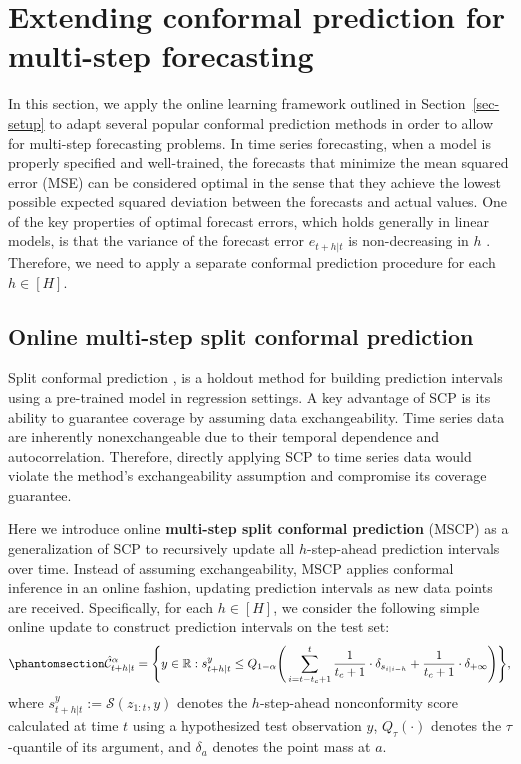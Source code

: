 \documentclass[
  11pt,
  12pt]{article}
\theoremstyle{plain}
\theoremstyle{remark}
\begin{document}
\section{Extending conformal prediction for multi-step
forecasting}\label{sec-ext}

In this section, we apply the online learning framework outlined in
Section~\ref{sec-setup} to adapt several popular conformal prediction
methods in order to allow for multi-step forecasting problems. In time
series forecasting, when a model is properly specified and well-trained,
the forecasts that minimize the mean squared error (MSE) can be
considered optimal in the sense that they achieve the lowest possible
expected squared deviation between the forecasts and actual values. One
of the key properties of optimal forecast errors, which holds generally
in linear models, is that the variance of the forecast error
\(e_{t+h|t}\) is non-decreasing in \(h\)
\citep{tong1990, diebold1996, patton2007}. Therefore, we need to apply a
separate conformal prediction procedure for each \(h \in [H]\).

\subsection{Online multi-step split conformal
prediction}\label{online-multi-step-split-conformal-prediction}

Split conformal prediction \citep[SCP, also called inductive conformal
prediction,][]{papadopoulos2002, vovk2005, lei2018}, is a holdout method
for building prediction intervals using a pre-trained model in
regression settings. A key advantage of SCP is its ability to guarantee
coverage by assuming data exchangeability. Time series data are
inherently nonexchangeable due to their temporal dependence and
autocorrelation. Therefore, directly applying SCP to time series data
would violate the method's exchangeability assumption and compromise its
coverage guarantee.

Here we introduce online \textbf{multi-step split conformal prediction}
(MSCP) as a generalization of SCP to recursively update all
\(h\)-step-ahead prediction intervals over time. Instead of assuming
exchangeability, MSCP applies conformal inference in an online fashion,
updating prediction intervals as new data points are received.
Specifically, for each \(h \in [H]\), we consider the following simple
online update to construct prediction intervals on the test set:
\begin{equation}\phantomsection\label{eq-mscp}{
\hat{\mathcal{C}}_{t+h|t}^{\alpha} = \Bigg\{y\in\mathbb{R}: s_{t+h|t}^{y} \leq Q_{1-\alpha}\Bigg(\sum_{i=t-t_c+1}^{t}\frac{1}{t_c+1}\cdot\delta_{s_{i|i-h}}+\frac{1}{t_c+1}\cdot\delta_{+\infty}\Bigg)\Bigg\},
}\end{equation} where \(s_{t+h|t}^{y}:=\mathcal{S}(z_{1:t}, y)\) denotes
the \(h\)-step-ahead nonconformity score calculated at time \(t\) using
a hypothesized test observation \(y\), \(Q_\tau(\cdot)\) denotes the
\(\tau\)-quantile of its argument, and \(\delta_a\) denotes the point
mass at \(a\).
\end{document}
